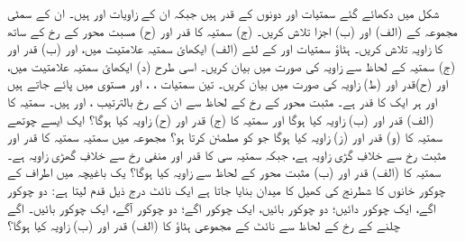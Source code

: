 شکل   میں دکھائے گئے سمتیات    اور   دونوں کے قدر  ہیں جبکہ ان کے زاویات    اور   ہیں۔ ان کے سمٹی مجموعہ   کے  (الف)   اور  (ب)  اجزا تلاش کریں۔  (ج) سمتیہ   کا قدر اور (ح) مسبت    محور کے رخ کے ساتھ    کا زاویہ تلاش کریں۔  
  ہٹاؤ سمتیات       اور         کے لئے  (الف) ایکھائ سمتیہ علامتیت میں، اور  (ب) قدر  اور  (ج) سمتیہ    کے لحاظ سے زاویہ کی صورت میں    بیان کریں۔ اسی طرح  (د) ایکھائ سمتیہ علامتیت میں، اور  (ح)قدر  اور  (ط) زاویہ کی صورت میں    بیان کریں۔  
تین سمتیات   ،   ، اور   مستوی   میں پائے جاتے ہیں اور ہر ایک کا قدر   ہے۔ مثبت   محور کے رخ کے لحاظ سے ان کے رخ بالترتیب   ،   اور   ہیں۔ سمتیہ   کا  (الف) قدر  اور  (ب) زاویہ  کیا ہوگا اور سمتیہ    کا  (ج) قدر  اور  (ح) زاویہ کیا ہوگا؟ ایک ایسے چوتھے سمتیہ    کا  (و) قدر  اور  (ز) زاویہ  کیا ہوگا جو   کو مطمئن کرتا ہو؟  
مجموعہ   میں سمتیہ سمتیہ   کا قدر    اور مثبت    رخ سے خلافِ گڑی زاویہ    ہے، جبکہ سمتیہ سی کا قدر    اور منفی   رخ سے خلافِ گھڑی زاویہ    ہے۔ سمتیہ   کا  (الف) قدر  اور  (ب) مثبت  محور کے لحاظ سے زاویہ کیا ہوگا؟  
 یک باغیچہ میں   اطراف کے چوکور خانوں کا شطرنج کی کھیل کا میدان بنایا جاتا ہے ایک نائٹ درج ذیل قدم لیتا ہے:  دو چوکور اگے، ایک چوکور دائیں؛    دو چوکور بائیں، ایک چوکور اگے؛    دو چوکور آگے، ایک چوکور بائیں۔ اگے چلنے کے رخ کے لحاظ سے نائٹ کے مجموعی ہٹاؤ کا  (الف) قدر  اور  (ب) زاویہ  کیا ہوگا؟  
